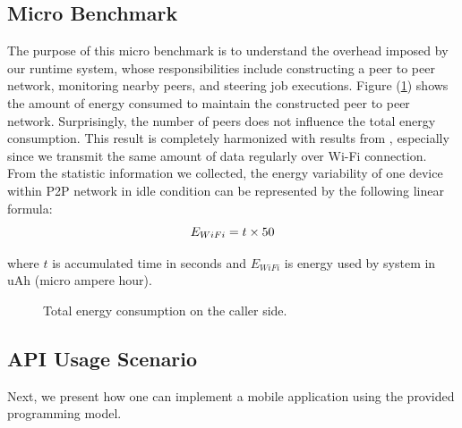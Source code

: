 \documentclass{sig-alternate}
\begin{document}
\subsection{Micro Benchmark}
The purpose of this micro benchmark is to understand the overhead imposed by our runtime system, whose responsibilities include constructing a peer to peer network, monitoring nearby peers, and steering job executions. Figure (\ref{fig:microb_24}) shows the amount of energy consumed to maintain the constructed peer to peer network. Surprisingly, the number of peers does not influence the total energy consumption. This result is completely harmonized with results from \cite{wifi_energy}, especially since we transmit the same amount of data regularly over Wi-Fi connection. From the statistic information we collected, the energy variability of one device within P2P network in idle condition can be represented by the following linear formula:
\begin{equation} \small
\label{eq:wifi_overload}
E_{WiFi} = t \times 50
\end{equation}

\noindent 
where $t$ is accumulated time in seconds and $E_{WiFi}$ is energy used by system in uAh (micro ampere hour).

\begin{figure}
	\hspace*{-0.15cm}
	\caption{Total energy consumption on the caller side.}
	\label{fig:microb_24}
\end{figure}


\subsection{API Usage Scenario}
\label{sec:apiusage}
Next, we present how one can implement a mobile application using the provided programming model.
\end{document}
